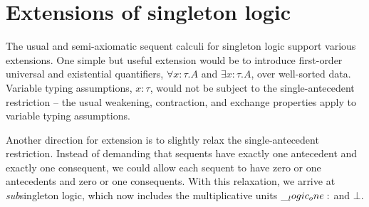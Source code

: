 




\section{Extensions of singleton logic}\label{sec:singleton-logic:extensions}

The usual and semi-axiomatic sequent calculi for singleton logic support various extensions.
One simple but useful extension would be to introduce first-order universal and existential quantifiers, $\forall x{:}\tau.A$ and $\exists x{:}\tau.A$, over well-sorted data.
Variable typing assumptions, $x{:}\tau$, would not be subject to the single-antecedent restriction -- the usual weakening, contraction, and exchange properties apply to variable typing assumptions.

Another direction for extension is to slightly relax the single-antecedent restriction.
Instead of demanding that sequents have exactly one antecedent and exactly one consequent, we could allow each sequent to have zero or one antecedents and zero or one consequents.
With this relaxation, we arrive at \emph{sub}singleton logic, which now includes the multiplicative units $\__logic_one:$ and $\bot$.


